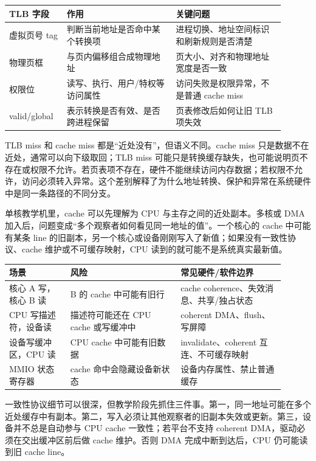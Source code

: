 \begin{longtable}{L{0.18\linewidth}L{0.36\linewidth}L{0.36\linewidth}}
\toprule
TLB 字段 & 作用 & 关键问题 \\
\midrule
虚拟页号 tag & 判断当前地址是否命中某个转换项 & 进程切换、地址空间标识和刷新规则是否清楚 \\
物理页框 & 与页内偏移组合成物理地址 & 页大小、对齐和物理地址宽度是否一致 \\
权限位 & 读写、执行、用户/特权等访问属性 & 访问失败是权限异常，不是普通 cache miss \\
valid/global & 表示转换是否有效、是否跨进程保留 & 页表修改后如何让旧 TLB 项失效 \\
\bottomrule
\end{longtable}

TLB miss 和 cache miss 都是“近处没有”，但语义不同。cache miss 只是数据不在近处，通常可以向下级取回；TLB miss 可能只是转换缓存缺失，也可能说明页不存在或权限不允许。若页表项不存在，硬件不能继续访问内存数据；若权限不允许，访问必须转入异常。这个差别解释了为什么地址转换、保护和异常在系统硬件中是同一条路径的不同分支。

单核教学机里，cache 可以先理解为 CPU 与主存之间的近处副本。多核或 DMA 加入后，问题变成“多个观察者如何看见同一地址的值”。一个核心的 cache 中可能有某条 line 的旧副本，另一个核心或设备刚刚写入了新值；如果没有一致性协议、cache 维护或不可缓存映射，CPU 读到的就可能不是系统真实最新值。

\begin{longtable}{L{0.2\linewidth}L{0.36\linewidth}L{0.34\linewidth}}
\toprule
场景 & 风险 & 常见硬件/软件边界 \\
\midrule
核心 A 写，核心 B 读 & B 的 cache 中可能有旧行 & cache coherence、失效消息、共享/独占状态 \\
CPU 写描述符，设备读 & 描述符可能还在 CPU cache 或写缓冲中 & coherent DMA、flush、写屏障 \\
设备写缓冲区，CPU 读 & CPU cache 中可能有旧数据 & invalidate、coherent 互连、不可缓存映射 \\
MMIO 状态寄存器 & cache 命中会隐藏设备新状态 & 设备内存属性、禁止普通缓存 \\
\bottomrule
\end{longtable}

一致性协议细节可以很深，但教学阶段先抓住三件事。第一，同一地址可能在多个近处缓存中有副本。第二，写入必须让其他观察者的旧副本失效或更新。第三，设备并不总是自动参与 CPU cache 一致性；若平台不支持 coherent DMA，驱动必须在交出缓冲区前后做 cache 维护。否则 DMA 完成中断到达后，CPU 仍可能读到旧 cache line。

